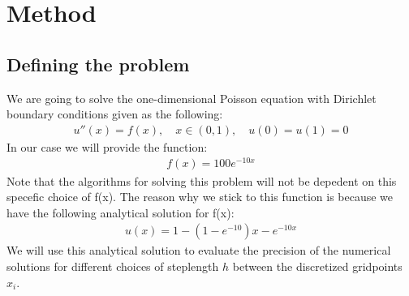 \documentclass[american,a4paper,12pt]{article}
\begin{document}
\section{Method}
  \subsection{Defining the problem}
    We are going to solve the one-dimensional Poisson equation with Dirichlet boundary conditions given as the following:
    \begin{align*}
      u''(x) = f(x), \quad x \in (0,1), \quad u(0) = u(1) = 0
    \end{align*}
    In our case we will provide the function:
    \begin{align*}
      f(x) = 100e^{-10x}
    \end{align*}
    Note that the algorithms for solving this problem will not be depedent on this specefic choice of f(x). The reason why we stick to this function is because we have the following analytical solution for f(x):
    \begin{align*}
      u(x) = 1 - (1 - e^{-10})x - e^{-10x}
    \end{align*}
    We will use this analytical solution to evaluate the precision of the numerical solutions for different choices of steplength $h$ between the discretized gridpoints $x_i$.
\end{document}

